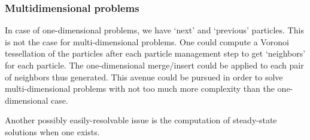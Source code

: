 \documentclass{article}
\begin{document}
\subsubsection{Multidimensional problems}
In case of one-dimensional problems, we have `next' and `previous' particles. This is not the case for multi-dimensional problems. One could compute a Voronoi tessellation of the particles after each particle management step to get `neighbors' for each particle. The one-dimensional merge/insert could be applied to each pair of neighbors thus generated. This avenue could be pursued in order to solve multi-dimensional problems with not too much more complexity than the one-dimensional case.

Another possibly easily-resolvable issue is the computation of steady-state solutions when one exists.

\printbibliography
\end{document}

